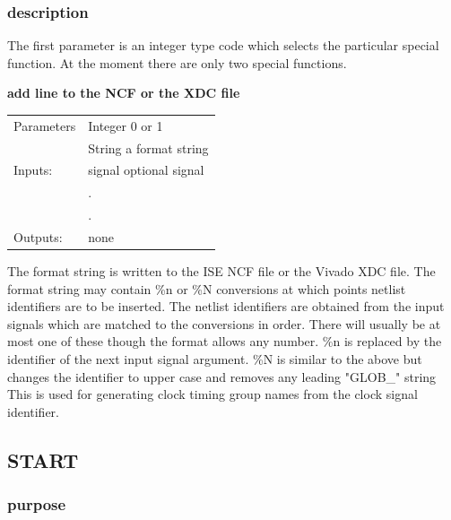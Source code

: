             \subsubsection{description}

                 The first parameter is an integer type code which selects the
                 particular special function. At the moment there are only two
                 special functions.

                {\bf add line to the NCF or the XDC file}

                \begin{tabular}{| l | l |}
                \hline
                Parameters  & Integer 0 or 1 \\
                            & String  a format string \\
                \hline
                Inputs:     & signal  optional signal \\
                            & . \\
                            & . \\
                \hline
                Outputs:    & none \\
                \hline
                \end{tabular}

                The format string is written to the ISE NCF file or the Vivado
                XDC file. The format string may contain \%n or \%N conversions
                at which points netlist identifiers are to be inserted. The
                netlist identifiers are obtained from the input signals which
                are matched to the conversions in order. There will usually be
                at most one of these though the format allows any number. \%n is
                replaced by the identifier of the next input signal argument.
                \%N is similar to the above but changes the identifier to upper
                case and removes any leading "GLOB\_" string  This is used for
                generating clock timing group names from the clock signal
                identifier.

        \subsection{START}

            \subsubsection{purpose}
            
